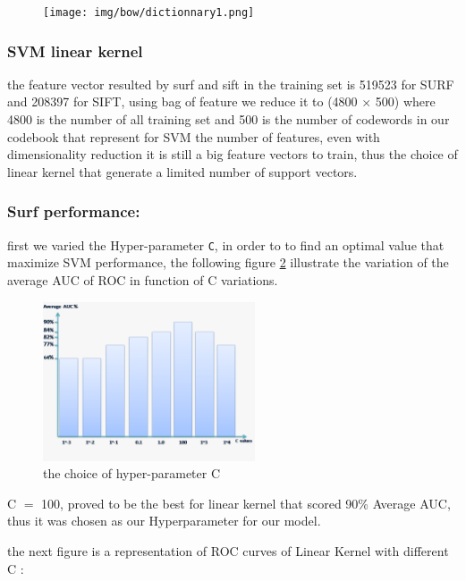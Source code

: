 \begin{figure}[H]
\centering
\texttt{[image: img/bow/dictionnary1.png]}
\caption{}
\label{fig:codbooksize}
\end{figure}

\subsubsection{SVM linear kernel}

the feature vector resulted  by surf and sift  in the training set is  519523 for SURF  and 208397 for SIFT, using  bag of feature we reduce it to (4800 $\times$ 500) where 4800 is the number of all training set and 500 is the number of codewords in our codebook  that represent for SVM the number of features, even with dimensionality reduction it is still a big feature vectors to train, thus the choice of linear kernel that generate a limited number of support vectors.


\subsubsection{Surf performance: }
first we varied the Hyper-parameter \texttt{C}, in order to to find an optimal value that maximize SVM performance, the following figure \ref{fig:C} illustrate the variation  of the average AUC of ROC in function of C variations.

\begin{figure}[H]
\centering
\includegraphics[width=0.56\textwidth]{img/C_values.png}
\caption{the choice of hyper-parameter C }
\label{fig:C}
\end{figure}

C $=$ 100, proved to be the best for linear kernel that scored 90\% Average AUC, thus it was chosen as our Hyperparameter for our model.


the next figure is a representation of ROC curves of Linear Kernel with different C :

